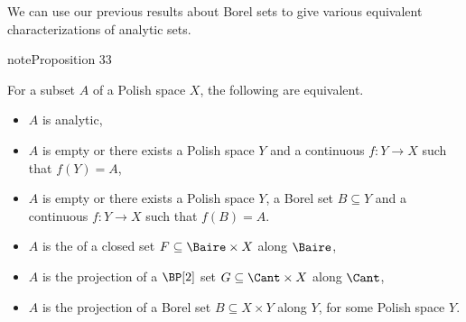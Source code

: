\documentclass[letterpaper,10pt,english]{jupyterBook}
\begin{document}
\sphinxAtStartPar
We can use our previous results about Borel sets to give various equivalent characterizations of analytic sets.
\label{analytic:characterization-analytic}
\begin{sphinxadmonition}{note}{Proposition 33}



\sphinxAtStartPar
For a subset \(A\) of a Polish space \(X\), the following are equivalent.
\begin{itemize}
\item {} 
\sphinxAtStartPar
{} \(A\) is analytic,

\item {} 
\sphinxAtStartPar
{} \(A\) is empty or there exists a Polish space \(Y\) and a continuous \(f:Y \to X\) such that \(f(Y) = A\),

\item {} 
\sphinxAtStartPar
{} \(A\) is empty or there exists a Polish space \(Y\), a Borel set \(B \subseteq Y\) and a continuous \(f:Y \to X\) such that \(f(B) = A\).

\item {} 
\sphinxAtStartPar
{} \(A\) is the  of a closed set \(F \subseteq \Baire \times X\) along \(\Baire\),

\item {} 
\sphinxAtStartPar
{} \(A\) is the projection of a \(\BP[2]\) set \(G \subseteq  \Cant \times   X  \) along \(\Cant\),

\item {} 
\sphinxAtStartPar
{} \(A\) is the projection of a Borel set \(B \subseteq X\times Y\) along \(Y\), for some Polish space \(Y\).

\end{itemize}
\end{sphinxadmonition}
\end{document}
